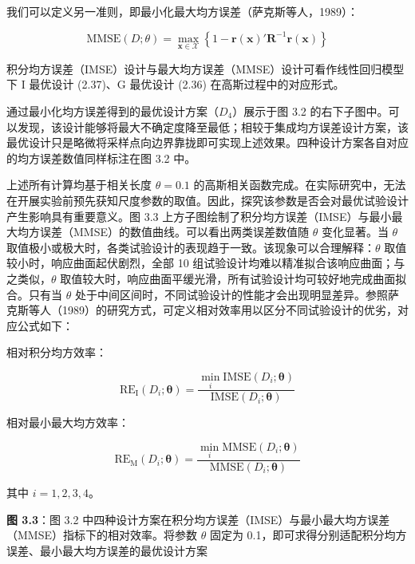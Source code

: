 \documentclass{ctexart}
\begin{document}
我们可以定义另一准则，即最小化最大均方误差（萨克斯等人，1989）：

\begin{equation*}
\mathrm{MMSE}(D;\theta)=\max_{\boldsymbol{x}\in\mathcal{X}}\left\{1-\boldsymbol{r}(\boldsymbol{x})'\boldsymbol{R}^{-1}\boldsymbol{r}(\boldsymbol{x})\right\}
\tag{3.3}
\end{equation*}

积分均方误差（IMSE）设计与最大均方误差（MMSE）设计可看作线性回归模型下 I 最优设计 (2.37)、G 最优设计 (2.36) 在高斯过程中的对应形式。

通过最小化均方误差得到的最优设计方案（$D_4$）展示于图 3.2 的右下子图中。可以发现，该设计能够将最大不确定度降至最低；相较于集成均方误差设计方案，该最优设计只是略微将采样点向边界靠拢即可实现上述效果。四种设计方案各自对应的均方误差数值同样标注在图 3.2 中。

上述所有计算均基于相关长度 $\theta=0.1$ 的高斯相关函数完成。在实际研究中，无法在开展实验前预先获知尺度参数的取值。因此，探究该参数是否会对最优试验设计产生影响具有重要意义。图 3.3 上方子图绘制了积分均方误差（IMSE）与最小最大均方误差（MMSE）的数值曲线。可以看出两类误差数值随 $\theta$ 变化显著。当 $\theta$ 取值极小或极大时，各类试验设计的表现趋于一致。该现象可以合理解释：$\theta$ 取值较小时，响应曲面起伏剧烈，全部 10 组试验设计均难以精准拟合该响应曲面；与之类似，$\theta$ 取值较大时，响应曲面平缓光滑，所有试验设计均可较好地完成曲面拟合。只有当 $\theta$ 处于中间区间时，不同试验设计的性能才会出现明显差异。参照萨克斯等人（1989）的研究方式，可定义相对效率用以区分不同试验设计的优劣，对应公式如下：

相对积分均方效率：

\begin{equation*}
\mathrm{RE}_\mathrm{I}(D_i;\boldsymbol{\theta})=\frac{\min_i\mathrm{IMSE}(D_i;\boldsymbol{\theta})}{\mathrm{IMSE}(D_i;\boldsymbol{\theta})}
\end{equation*}

相对最小最大均方效率：

\begin{equation*}
\mathrm{RE}_\mathrm{M}(D_i;\boldsymbol{\theta})=\frac{\min_i\mathrm{MMSE}(D_i;\boldsymbol{\theta})}{\mathrm{MMSE}(D_i;\boldsymbol{\theta})}
\end{equation*}

其中 $i=1,2,3,4$。

\begin{mdquote}
\textbf{图 3.3}：图 3.2 中四种设计方案在积分均方误差（IMSE）与最小最大均方误差（MMSE）指标下的相对效率。将参数 $\theta$ 固定为 0.1，即可求得分别适配积分均方误差、最小最大均方误差的最优设计方案
\end{mdquote}
\end{document}
